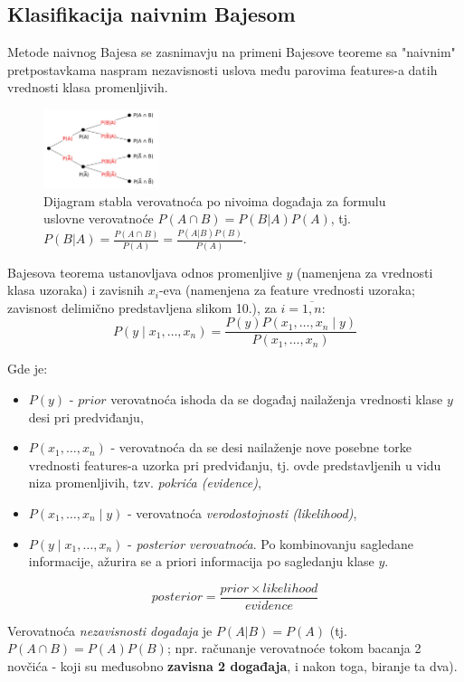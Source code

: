 \documentclass[fontsize=12bp, paper=a4]{scrarticle}
\begin{document}
\subsection{Klasifikacija naivnim Bajesom}
Metode naivnog Bajesa se zasnimavju na primeni Bajesove teoreme sa "naivnim" pretpostavkama naspram nezavisnosti uslova među parovima features-a datih vrednosti klasa promenljivih.\cite{nb}

\begin{figure}[h!]
    \centering
    \includegraphics[width=0.3\textwidth]{image-10}
    \caption{\centering Dijagram stabla verovatnoća po nivoima događaja za formulu uslovne verovatnoće $P(A\cap B) = P(B|A)P(A)$, tj. $P(B|A) = \frac{P(A\cap B)}{P(A)} = \frac{P(A|B)P(B)}{P(A)}$.}
\end{figure}

 Bajesova teorema ustanovljava odnos promenljive $y$ (namenjena za vrednosti klasa uzoraka) i zavisnih $x_i$-eva (namenjena za feature vrednosti uzoraka; zavisnost delimično predstavljena slikom 10.), za $i=\overline{1,n}$:
$$P(y \mid x_1, \dots, x_n) = \frac{P(y) P(x_1, \dots, x_n \mid y)}
                                 {P(x_1, \dots, x_n)}$$

Gde je:
\begin{itemize}
    \item $P(y)$ - $prior$ verovatnoća ishoda da se događaj nailaženja vrednosti klase $y$ desi pri predviđanju,
    \item $P(x_1, \dots, x_n)$ - verovatnoća da se desi nailaženje nove posebne torke vrednosti features-a uzorka pri predviđanju, tj. ovde predstavljenih u vidu niza promenljivih, tzv. \textit{pokrića (evidence)},
    \item $P(x_1, \dots, x_n \mid y)$ - verovatnoća \textit{verodostojnosti (likelihood)},
    \item $P(y \mid x_1, \dots, x_n)$ - \textit{posterior verovatnoća}. Po kombinovanju sagledane informacije, ažurira se a priori informacija po sagledanju klase $y$.\cite{nb-names}
\end{itemize}

$$posterior = \frac{prior \times likelihood}{{evidence}}$$

\vbox{}
Verovatnoća \textit{nezavisnosti događaja}\cite{probabiliy-independence} je $P(A|B)=P(A)$ (tj. $P(A \cap B)=P(A)P(B)$; npr. računanje verovatnoće tokom bacanja 2 novčića - koji su međusobno \textbf{zavisna 2 događaja}, i nakon toga, biranje ta dva). 
\end{document}
